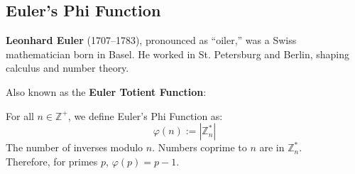\subsection{Euler's Phi Function}
\begin{Tip}
    \textbf{Leonhard Euler} (1707–1783), pronounced as ``oiler,'' was a Swiss mathematician born in Basel. He worked in St. Petersburg and Berlin, shaping calculus and number theory.
\end{Tip}

\noindent
Also known as the \textbf{Euler Totient Function}:
\begin{Def}

    For all $n\in\mathbb{Z^+}$, we define Euler's Phi Function as:
    \[\varphi (n):=|\mathbb{Z}_n^*|\]
    \noindent
    The number of inverses modulo $n$. Numbers coprime to $n$ are in $\mathbb{Z}_n^*$.\\
     Therefore, for primes $p$, $\varphi(p)=p-1$.
\end{Def}

